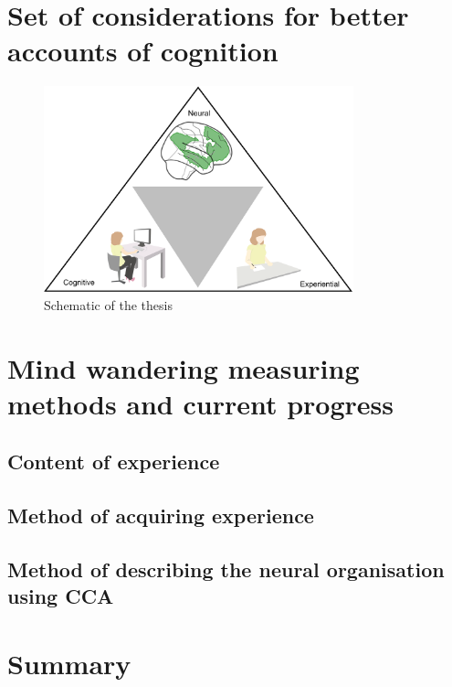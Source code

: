 \section{Set of considerations for better accounts of cognition}


\begin{figure}[H]
	\centering
	\includegraphics[width=0.8\textwidth]{chapters/img/thesisfig1.png}
	\caption{Schematic of the thesis}
	\label{fig:thesis:fig1}
\end{figure}

\section{Mind wandering measuring methods and current progress}

\subsection{Content of experience}

\cite{Medea2016}
\cite{RubyPlos2013}
\cite{Smallwood2016}

\subsection{Method of acquiring experience}
\cite{Christoff2009}
\cite{Konishi2015}

\cite{Smallwood2011}
\cite{Gorgolewski2014}

\subsection{Method of describing the neural organisation using CCA}
\section{Summary}

